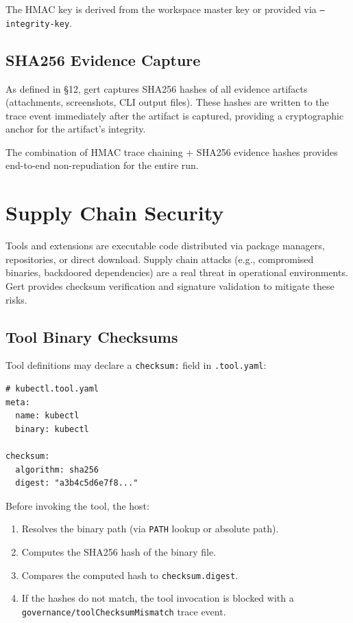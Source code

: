 The HMAC key is derived from the workspace master key or provided via
\texttt{--integrity-key}.

\subsection{SHA256 Evidence Capture}

As defined in §12, gert captures SHA256 hashes of all evidence artifacts
(attachments, screenshots, CLI output files).  These hashes are written to the
trace event immediately after the artifact is captured, providing a
cryptographic anchor for the artifact's integrity.

The combination of HMAC trace chaining + SHA256 evidence hashes provides
end-to-end non-repudiation for the entire run.

\section{Supply Chain Security}
\label{sec:supply-chain}

Tools and extensions are executable code distributed via package managers,
repositories, or direct download.  Supply chain attacks (e.g., compromised
binaries, backdoored dependencies) are a real threat in operational
environments.  Gert provides checksum verification and signature validation
to mitigate these risks.

\subsection{Tool Binary Checksums}

Tool definitions may declare a \texttt{checksum:} field in
\texttt{.tool.yaml}:

\begin{verbatim}
# kubectl.tool.yaml
meta:
  name: kubectl
  binary: kubectl

checksum:
  algorithm: sha256
  digest: "a3b4c5d6e7f8..."
\end{verbatim}

Before invoking the tool, the host:

\begin{enumerate}
  \item Resolves the binary path (via \texttt{PATH} lookup or absolute path).
  \item Computes the SHA256 hash of the binary file.
  \item Compares the computed hash to \texttt{checksum.digest}.
  \item If the hashes do not match, the tool invocation is blocked with a
        \texttt{governance/toolChecksumMismatch} trace event.
\end{enumerate}

